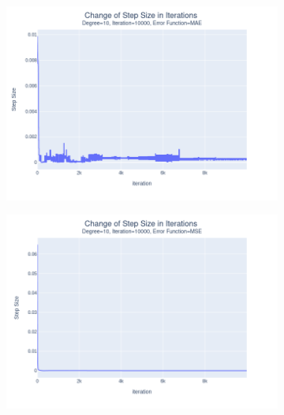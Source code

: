 \documentclass[14pt,a4]{article}
\begin{document}
\begin{figure}[h]
\begin{subfigure}{0.3\linewidth}
        \includegraphics[width=\textwidth]{images/implementation/q1/part_d/step_size/10_10000_MAE.png}
    \end{subfigure}
    \hfill
    \begin{subfigure}{0.3\textwidth}
        \centering
        \includegraphics[width=\textwidth]{images/implementation/q1/part_d/step_size/10_10000_MSE.png}
    \end{subfigure}
    \hfill
    \begin{subfigure}{0.3\linewidth}
        \centering

\end{subfigure}
\end{figure}
\end{document}
